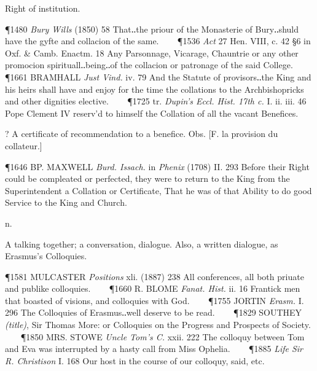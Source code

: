 \begin{description}[wide, labelwidth=!, labelindent=0pt]
\begin{myenumerate}
 Right of institution.

\P 1480 \textit{Bury  Wills} (1850) 58 That‥the priour of the Monasterie of Bury‥shuld have the gyfte and collacion of the same.    
\P 1536  \textit{Act} 27 Hen. VIII, c. 42 §6 in Oxf. \& Camb. Enactm. 18 Any Parsonnage, Vicarage, Chauntrie or any other promocion spirituall‥being‥of the collacion or patronage of the said College.    
\P 1661 BRAMHALL  \textit{Just Vind.} iv. 79 And the Statute of provisors‥the King and his heirs shall have and enjoy for the time the collations to the Archbishopricks and other dignities elective.    
\P 1725 tr. \textit{Dupin's Eccl. Hist. 17th c.} I. ii. iii. 46 Pope Clement IV reserv'd to himself the Collation of all the vacant Benefices.

 ? A certificate of recommendation to a benefice. Obs. [F. la provision du collateur.]

\P 1646 BP. MAXWELL  \textit{Burd. Issach.} in \textit{Phenix} (1708) II. 293 Before their Right could be compleated or perfected, they were to return to the King from the Superintendent a Collation or Certificate, That he was of that Ability to do good Service to the King and Church.
\end{myenumerate}


 n.

\noindent {}

\vspace{-0.3cm}

\begin{myenumerate}

 A talking together; a conversation, dialogue. Also, a written dialogue, as Erasmus's Colloquies.

\P 1581 MULCASTER  \textit{Positions} xli. (1887) 238 All conferences, all both priuate and publike colloquies.    
\P 1660 R. BLOME  \textit{Fanat. Hist.} ii. 16 Frantick men that boasted of visions, and colloquies with God.    
\P 1755 JORTIN  \textit{Erasm.} I. 296 The Colloquies of Erasmus‥well deserve to be read.    
\P 1829 SOUTHEY  \textit{(title)}, Sir Thomas More: or Colloquies on the Progress and Prospects of Society.    
\P 1850 MRS. STOWE  \textit{Uncle Tom's C.} xxii. 222 The colloquy between Tom and Eva was interrupted by a hasty call from Miss Ophelia.    
\P 1885  \textit{Life Sir R. Christison} I. 168 Our host in the course of our colloquy, said, etc.


\end{myenumerate}
\end{description}
